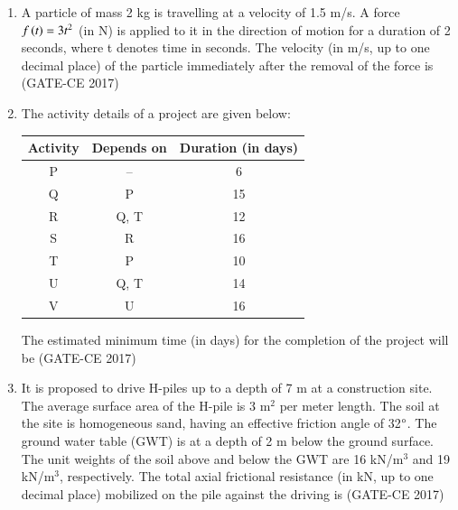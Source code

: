 \documentclass[journal,12pt,onecolumn]{article}
\theoremstyle{remark}
\begin{document}
\begin{enumerate}
    \item A particle of mass 2 kg is travelling at a velocity of 1.5 m/s. A force $f\left(t\right) = 3t^2$ (in N) is applied to it in the direction of motion for a duration of 2 seconds, where t denotes time in seconds. The velocity (in m/s, up to one decimal place) of the particle immediately after the removal of the force is \underline{\hspace{3cm}}\hfill (GATE-CE 2017)

    \item The activity details of a project are given below:
    \begin{table}[H]
    \centering
    \begin{tabular}{|c|c|c|}
    \hline
    Activity & Depends on & Duration (in days) \\
    \hline
    P & -- & 6 \\
    Q & P & 15 \\
    R & Q, T & 12 \\
    S & R & 16 \\
    T & P & 10 \\
    U & Q, T & 14 \\
    V & U & 16 \\
    \hline
    \end{tabular}
    \end{table}
    The estimated minimum time (in days) for the completion of the project will be \underline{\hspace{3cm}}\hfill (GATE-CE 2017)

    \item It is proposed to drive H-piles up to a depth of 7 m at a construction site. The average surface area of the H-pile is 3 m$^2$ per meter length. The soil at the site is homogeneous sand, having an effective friction angle of 32$\degree$. The ground water table (GWT) is at a depth of 2 m below the ground surface. The unit weights of the soil above and below the GWT are 16 kN/m$^3$ and 19 kN/m$^3$, respectively. The total axial frictional resistance (in kN, up to one decimal place) mobilized on the pile against the driving is \underline{\hspace{3cm}}\hfill (GATE-CE 2017)


\end{enumerate}
\end{document}
